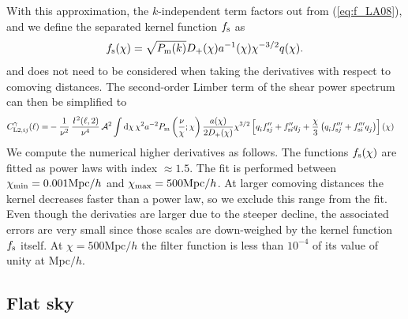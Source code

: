 \documentclass[useAMS,usenatbib]{mn2e} %
\newcommand{\ellbar}{\hbox{\it \l}\,}
\newcommand{\pref}{{\cal A}}
\begin{document}
With this approximation, the $k$-independent term factors out
from (\ref{eq:f_LA08}), and we define the separated kernel function $f_{\rm s}$ as
%
\begin{equation}
  f_{\rm s}(\chi) = \sqrt{P_{\rm m}(k)} D_+(\chi) a^{-1}(\chi) \chi^{-3/2} q(\chi).
  \label{eq:f_LA08_s}
\end{equation}
%
and does not need to be considered when taking the derivatives with respect to comoving distances.
The second-order Limber term of the shear power spectrum can then be simplified to
%
\begin{align}
  C^\gamma_{{\rm L2}, ij}(\ell) = & - \frac 1 {\nu^2} \, \frac{\ellbar^2(\ell, 2)}{\nu^4} \, \pref^2
    \int {\rm d} \chi \, \chi^{2} a^{-2} P_{\rm m}\left(\frac\nu\chi; \chi\right)
    \frac {a(\chi)}{2 D_+(\chi)} \chi^{3/2}
    \left[ q^{}_i f^{\prime\prime}_{{\rm s} j} + f^{\prime\prime}_{{\rm s}i} q^{}_j
      + \frac{\chi}{3} \left( q^{}_i f^{\prime\prime\prime}_{{\rm s}j} + f^{\prime\prime\prime}_{{\rm s}i} q^{}_j
      \right)
    \right](\chi)
  \label{eq:C_ell_limber2_dr_s}
\end{align}
%
We compute the numerical higher derivatives as follows. The functions $f_{\rm
s}(\chi)$ are fitted as power laws with index $\approx 1.5$. The fit is
performed between $\chi_{\rm min} = 0.001 {\rm Mpc}/h$ and $\chi_{\rm max} =
500 \mbox{Mpc}/h$. At larger comoving distances the kernel decreases faster
than a power law, so we exclude this range from the fit. Even though the
derivaties are larger due to the steeper decline, the associated errors are
very small since those scales are down-weighed by the kernel function $f_{\rm
s}$ itself. At $\chi = 500 \mbox{Mpc}/h$ the filter function is less than
$10^{-4}$ of its value of unity at Mpc$/h$.


\subsection{Flat sky}
\end{document}
